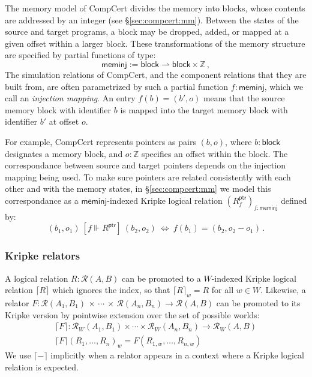 \documentclass[acmsmall,timestamp,review,anonymous]{acmart}
\newcommand{\kw}[1]{\ensuremath{ \mathsf{#1} }}
\newcommand{\ifr}[1]{\ [{#1}]\ }
\begin{document}
\begin{example} \label{ex:meminj} %
The memory model of CompCert divides the memory into blocks,
whose contents are addressed by an integer
(see \S\ref{sec:compcert:mm}).
Between the states of the source and target programs,
a block may be dropped, added, or
mapped at a given offset within a larger block.
These transformations of the memory structure
are specified by partial functions of type:
\[
  \kw{meminj} := \kw{block} \rightharpoonup \kw{block} \times \mathbb{Z} \,,
\]
The simulation relations of CompCert,
and the component relations that they are built from,
are often parametrized by such a partial function $f : \kw{meminj}$,
which we call an \emph{injection mapping}.
An entry $f(b) = (b', o)$
means that the source memory block with identifier $b$
is mapped into the target memory block with identifier $b'$
at offset $o$.

For example,
CompCert represents pointers as pairs $(b, o)$, where
$b : \kw{block}$ designates a memory block, and
$o : \mathbb{Z}$ specifies an offset within the block.
The correspondance between source and target pointers
depends on the injection mapping being used.
To make sure pointers are related consistently
with each other and with the memory states,
in \S\ref{sec:compcert:mm}
we model this correspondance as a $\kw{meminj}$-indexed
Kripke logical relation $(R^\kw{ptr}_f)_{f : \kw{meminj}}$
defined by:
\[
    (b_1, o_1) \ifr{f \Vdash R^\kw{ptr}} (b_2, o_2) \:\Leftrightarrow\:
    f(b_1) = (b_2, o_2 - o_1) \,.
\]
\end{example}

\subsubsection{Kripke relators}

A logical relation $R : \mathcal{R}(A, B)$
can be promoted to a $W$-indexed Kripke logical relation $\lceil R \rceil$
which ignores the index, so that $\lceil R \rceil_w = R$ for all $w \in W$.
Likewise,
a relator
  $F : \mathcal{R}(A_1, B_1) \,\times\,\cdots\,\times\,\mathcal{R}(A_n, B_n) \rightarrow \mathcal{R}(A, B)$
can be promoted to its Kripke version
by pointwise extension over the set of possible worlds:
\begin{gather*}
  \lceil F \rceil : \mathcal{R}_W(A_1, B_1) \times \cdots \times \mathcal{R}_W(A_n, B_n) \rightarrow \mathcal{R}_W(A, B) \\
  \lceil F \rceil (R_1, \ldots, R_n)_w = F(R_{1,w}, \ldots, R_{n,w})
\end{gather*}
We use $\lceil - \rceil$ implicitly
when a relator appears in a context where
a Kripke logical relation is expected.
\end{document}
